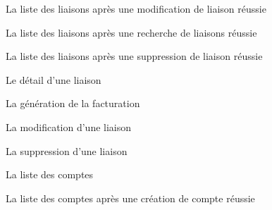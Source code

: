 \documentclass[a4paper,french,12pt]{article}
\begin{document}
		\begin{figure}[h!]
			\caption{La liste des liaisons après une modification de liaison réussie}
			\centering
		\end{figure} 
		
		\begin{figure}[h!]
			\caption{La liste des liaisons après une recherche de liaisons réussie}
			\centering
		\end{figure}
		
		\begin{figure}[h!]
			\caption{La liste des liaisons après une suppression de liaison réussie}
			\centering
		\end{figure} 

		\begin{figure}[h!]
			\caption{Le détail d'une liaison}
			\centering
		\end{figure}
			

		
		\begin{figure}[h!]
			\caption{La génération de la facturation}
			\centering
		\end{figure} 
		
		\begin{figure}[h!]
			\caption{La modification d'une liaison}
			\centering
		\end{figure} 
		
		
		
		\begin{figure}[h!]
			\caption{La suppression d'une liaison}
			\centering
		\end{figure}
		
			
		\begin{figure}[h!]
			\caption{La liste des comptes}
			\centering
		\end{figure} 
		
		\begin{figure}[h!]
			\caption{La liste des comptes après une création de compte réussie}
			\centering
		\end{figure}
		
\end{document}
